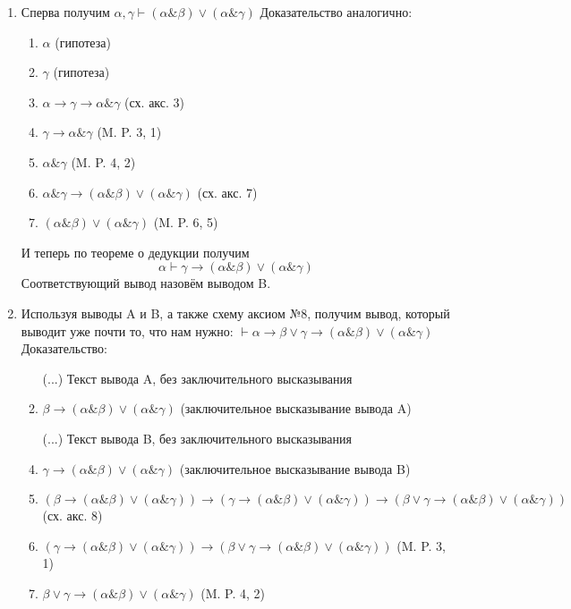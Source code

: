 \documentclass[10pt,a4paper,oneside]{article}
\begin{document}
\begin{enumerate}[label=(\alph*)]
\begin{enumerate}[label=(\Alph*)]
\item Сперва получим $\alpha,\gamma\vdash(\alpha\&\beta)\vee(\alpha\&\gamma)$
\newline
  Доказательство аналогично:
\begin{enumerate}[label=(\arabic*)]
\item $\alpha$ (гипотеза)
\item $\gamma$ (гипотеза)
\item $\alpha\rightarrow\gamma\rightarrow\alpha\&\gamma$ (сх. акс. 3)
\item $\gamma\rightarrow\alpha\&\gamma$ (M. P. 3, 1)
\item $\alpha\&\gamma$ (M. P. 4, 2)
\item $\alpha\&\gamma\rightarrow(\alpha\&\beta)\vee(\alpha\&\gamma)$ (сх. акс. 7)
\item $(\alpha\&\beta)\vee(\alpha\&\gamma)$ (M. P. 6, 5)
\end{enumerate}
И теперь по теореме о дедукции получим
$$\alpha\vdash\gamma\rightarrow(\alpha\&\beta)\vee(\alpha\&\gamma)$$
Соответствующий вывод назовём выводом B.

\item Используя выводы A и B, а также схему аксиом №8, получим вывод, который выводит
уже почти то, что нам нужно: 
\newline
$\vdash\alpha\rightarrow\beta\vee\gamma\rightarrow(\alpha\&\beta)\vee(\alpha\&\gamma)$
\newline 
Доказательство:
\begin{enumerate}[label=(\arabic*)]
\item[(...)] Текст вывода A, без заключительного высказывания
\item $\beta\rightarrow(\alpha\&\beta)\vee(\alpha\&\gamma)$ (заключительное высказывание вывода A)
\item[(...)] Текст вывода B, без заключительного высказывания
\item $\gamma\rightarrow(\alpha\&\beta)\vee(\alpha\&\gamma)$ (заключительное высказывание вывода B)
\item $(\beta\rightarrow(\alpha\&\beta)\vee(\alpha\&\gamma))\rightarrow(\gamma\rightarrow(\alpha\&\beta)\vee(\alpha\&\gamma))\rightarrow(\beta\vee\gamma\rightarrow(\alpha\&\beta)\vee(\alpha\&\gamma))$ (сх. акс. 8)
\item $(\gamma\rightarrow(\alpha\&\beta)\vee(\alpha\&\gamma))\rightarrow(\beta\vee\gamma\rightarrow(\alpha\&\beta)\vee(\alpha\&\gamma))$ (M. P. 3, 1)
\item $\beta\vee\gamma\rightarrow(\alpha\&\beta)\vee(\alpha\&\gamma)$ (M. P. 4, 2)
\end{enumerate}


\end{enumerate}
\end{enumerate}
\end{document}
